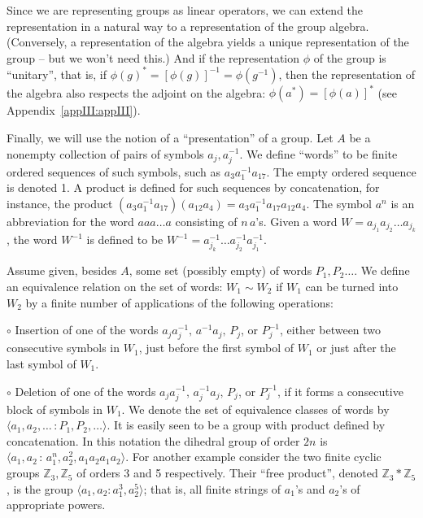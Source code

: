 \documentclass[reqno]{stml-l}
\theoremstyle{plain}
\theoremstyle{definition}
\numberwithin{equation}{chapter}
\begin{document}
Since we are representing groups as linear operators, we can extend the representation in a natural way to a representation of the group algebra. (Conversely, a representation of the algebra yields a unique representation of the group -- but we won't need this.) And if the representation $\phi$ of the group is ``unitary'', that is, if $\phi(g)^{\ast}=[\phi(g)]^{-1}=\phi(g^{-1})$, then the representation of the algebra also respects the adjoint on the algebra: $\phi(a^{\ast})=[\phi(a)]^{\ast}$ (see Appendix~\ref{appIII:appIII}).

Finally, we will use the notion of a ``presentation'' of a group. Let $A$ be a nonempty collection of pairs of symbols $a_{j},a_{j}^{-1}$. We define ``words'' to be finite ordered sequences of such symbols, such as $a_{3}a_{1}^{-1}a_{17}$. The empty ordered sequence is denoted 1. A product is defined for such sequences by concatenation, for instance, the product $(a_{3}a_{1}^{-1}a_{17})(a_{12}a_{4})=a_{3}a_{1}^{-1}a_{17}a_{12}a_{4}$. The symbol $a^{n}$ is an abbreviation for the word $aaa\ldots a$ consisting of $n\,a$'s. Given a word $W= a_{j_{1}}a_{j_{2}}\ldots a_{j_{k}}$, the word $W^{-1}$ is defined to be $W^{-1}=a_{j_{k}}^{-1}\ldots a_{j_{2}}^{-1}a_{j_{1}}^{-1}$.

Assume given, besides $A$, some set (possibly empty) of words $P_{1}, P_{2}\ldots$. We define an equivalence relation on the set of words: $W_{1}\sim W_{2}$ if $W_{1}$ can be turned into $W_{2}$ by a finite number of applications of the following operations:

$\circ$ Insertion of one of the words $a_{j}a_{j}^{-1},\,a^{-1}a_{j},\,P_{j}$, or $P_{j}^{-1}$, either between two consecutive symbols in $W_{1}$, just before the first symbol of $W_{1}$ or just after the last symbol of $W_{1}$.

$\circ$ Deletion of one of the words $a_{j}a_{j}^{-1},\,a_{j}^{-1}a_{j},\,P_{j}$, or $P_{j}^{-1}$, if it forms a consecutive block of symbols in $W_{1}$. We denote the set of equivalence classes of words by $\langle a_{1},a_{2},\ldots\,:P_{1},P_{2},\ldots\rangle$. It is easily seen to be a group with product defined by concatenation. In this notation the dihedral group of order $2n$ is $\langle a_{1},a_{2}\,:\,a_{1}^{n},a_{2}^{2}, a_{1}a_{2}a_{1}a_{2}\rangle$. For another example consider the two finite cyclic groups $\mathbb{Z}_{3},\mathbb{Z}_{5}$ of orders 3 and 5 respectively. Their ``free product'', denoted $\mathbb{Z}_{3}\ast \mathbb{Z}_{5}$, is the group $\langle a_{1},a_{2}:a_{1}^{3}, a_{2}^{5}\rangle$; that is, all finite strings of $a_{1}$'s and $a_{2}$'s of appropriate powers.
\end{document}
